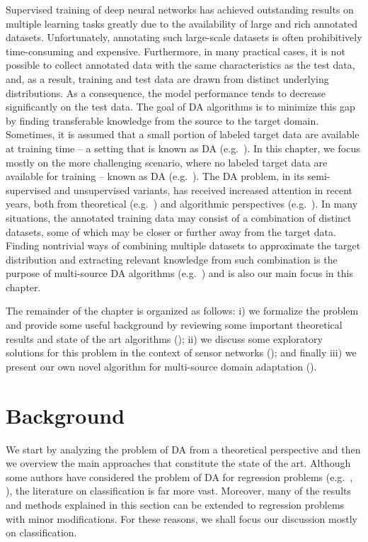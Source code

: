 Supervised training of deep neural networks has achieved outstanding results on multiple learning tasks greatly due to the availability of large and rich annotated datasets. Unfortunately, annotating such large-scale datasets is often prohibitively time-consuming and expensive. Furthermore, in many practical cases, it is not possible to collect annotated data with the same characteristics as the test data, and, as a result, training and test data are drawn from distinct underlying distributions. As a consequence, the model performance tends to decrease significantly on the test data. The goal of DA algorithms is to minimize this gap by finding transferable knowledge from the source to the target domain. Sometimes, it is assumed that a small portion of labeled target data are available at training time -- a setting that is known as  DA (e.g.\ \citet{Daume2010, Donahue2013, Kumar2010, Saito2019, Yao2015}). In this chapter, we focus mostly on the more challenging scenario, where no labeled target data are available for training -- known as  DA (e.g.\ \citet{Baktashmotlagh2013, Ganin2015, Kang2019, Long2016, Zhao2018}). The DA problem, in its semi-supervised and unsupervised variants, has received increased attention in recent years, both from theoretical (e.g.\ \citet{BenDavid2010, BenDavid2007, Blitzer2008, Cortes2014, Gopalan2013, Hoffman2018, Zhao2019}) and algorithmic perspectives (e.g.\ \citet{Ajakan2014, Becker2013, Fernando2013, Jhuo2012, Long2015, Louizos2015, Sun2016, Tzeng2017}). In many situations, the annotated training data may consist of a combination of distinct datasets, some of which may be closer or further away from the target data. Finding nontrivial ways of combining multiple datasets to approximate the target distribution and extracting relevant knowledge from such combination is the purpose of multi-source DA algorithms (e.g.\ \citet{Kim2017, Guo2018, Hoffman2018, Mansour2009, Sebag2019, Zhang2015, Zhao2018}) and is also our main focus in this chapter.

The remainder of the chapter is organized as follows: i) we formalize the problem and provide some useful background by reviewing some important theoretical results and state of the art algorithms (); ii) we discuss some exploratory solutions for this problem in the context of sensor networks (); and finally iii) we present our own novel algorithm for multi-source domain adaptation ().

\section{Background}
\label{sec:chp3_background}
We start by analyzing the problem of DA from a theoretical perspective and then we overview the main approaches that constitute the state of the art. Although some authors have considered the problem of DA for regression problems (e.g.\ \cite{Cortes2011}, \cite{Zhao2018}), the literature on classification is far more vast. Moreover, many of the results and methods explained in this section can be extended to regression problems with minor modifications. For these reasons, we shall focus our discussion mostly on classification.

